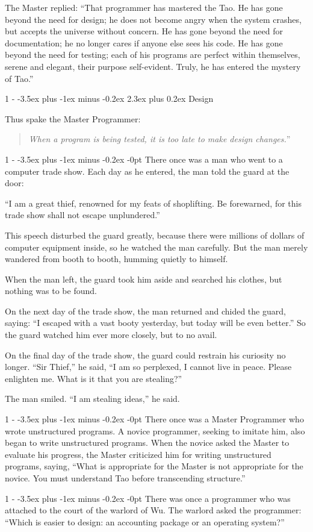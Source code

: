 \documentclass[12pt,letterpaper,titlepage]{article}
\makeatletter
\newlength{\intomargin}\setlength{\intomargin}{25pt}
\renewcommand{\section}{%
\@startsection{section}%
{1}%
{-\intomargin}%
{-3.5ex plus -1ex minus -0.2ex}%
{2.3ex plus 0.2ex}%
{\clearpage\normalfont\Large\bfseries}%
}
\renewcommand{\subsection}{%
\@startsection{subsection}%
{1}%
{-\intomargin}%
{-3.5ex plus -1ex minus -0.2ex}%
{-0pt}%
{\normalfont\normalsize\bfseries}%
}
\newcommand{\book}[2]{\section{#1}\par\hspace{-\intomargin}Thus spake the Master Programmer:%
\begin{quotation}\noindent\llap{``}\textsl{#2}''\end{quotation}\medskip}
\newcommand{\sect}{\subsection{}}
\makeatother
\begin{document}
The Master replied: ``That programmer has mastered the Tao. He has
gone beyond the need for design; he does not become angry when the
system crashes, but accepts the universe without concern. He has gone
beyond the need for documentation; he no longer cares if anyone else
sees his code. He has gone beyond the need for testing; each of his
programs are perfect within themselves, serene and elegant, their
purpose self-evident. Truly, he has entered the mystery of Tao.''

\book{Design}%
{When a program is being tested, it is too late to make design changes.}

\sect
There once was a man who went to a computer trade show. Each day as he
entered, the man told the guard at the door:

``I am a great thief, renowned for my feats of shoplifting. Be
forewarned, for this trade show shall not escape unplundered.''

This speech disturbed the guard greatly, because there were millions
of dollars of computer equipment inside, so he watched the man
carefully. But the man merely wandered from booth to booth, humming
quietly to himself.

When the man left, the guard took him aside and searched his clothes,
but nothing was to be found.

On the next day of the trade show, the man returned and chided the
guard, saying: ``I escaped with a vast booty yesterday, but today will
be even better.'' So the guard watched him ever more closely, but to
no avail.

On the final day of the trade show, the guard could restrain his
curiosity no longer. ``Sir Thief,'' he said, ``I am so perplexed, I
cannot live in peace. Please enlighten me. What is it that you are
stealing?''

The man smiled. ``I am stealing ideas,'' he said.

\sect
There once was a Master Programmer who wrote unstructured programs. A
novice programmer, seeking to imitate him, also began to write
unstructured programs. When the novice asked the Master to evaluate
his progress, the Master criticized him for writing unstructured
programs, saying, ``What is appropriate for the Master is not
appropriate for the novice. You must understand Tao before
transcending structure.''

\sect
There was once a programmer who was attached to the court of the
warlord of Wu. The warlord asked the programmer: ``Which is easier to
design: an accounting package or an operating system?''
\end{document}
